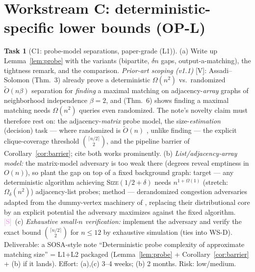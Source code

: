 \documentclass[11pt]{article}
\theoremstyle{definition}
\newtheorem{task}{Task}
\theoremstyle{remark}
\newcommand{\statusV}{\textcolor{green!45!black}{\textsf{[V]}}}
\newcommand{\statusS}{\textcolor{violet}{\textsf{[S]}}}
\newcommand{\Otil}{\widetilde{O}}
\begin{document}
\section{Workstream C: deterministic-specific lower bounds (OP-L)}
\label{sec:wsC}

\begin{task}[C1: probe-model separations, paper-grade (L1)]
\label{task:probe}
(a) Write up Lemma~\ref{lem:probe} with the variants (bipartite,
$\delta n$ gaps, output-a-matching), the tightness remark, and the
\cite{ABKRS04} comparison. \emph{Prior-art scoping (v1.1)}
\statusV{}: Assadi--Solomon \cite{AS19} (Thm.~3) already prove a
deterministic $\Omega(n^2)$ vs.\ randomized $\Otil(n\beta)$
separation for \emph{finding} a maximal matching on
adjacency-\emph{array} graphs of neighborhood independence
$\beta=2$, and \cite{ACK19} (Thm.~6) shows finding a maximal
matching needs $\Omega(n^2)$ queries even randomized. The note's
novelty claim must therefore rest on: the adjacency-\emph{matrix}
probe model, the size-\emph{estimation} (decision) task --- where
randomized is $\Otil(n)$ \cite{Beh21}, unlike finding --- the
explicit clique-coverage threshold
$\binom{\lceil n/2\rceil}{2}$, and the pipeline barrier of
Corollary~\ref{cor:barrier}; cite both works prominently.
(b) \emph{List/adjacency-array model:} the matrix-model adversary is too
weak there (degrees reveal emptiness in $O(n)$), so plant the gap on top
of a fixed background graph: target --- any deterministic algorithm
achieving \textsc{Size}$(1/2+\delta)$ needs $n^{1+\Omega(1)}$
(stretch: $\Omega_{\delta}(n^2)$) adjacency-list probes; method ---
derandomized congestion adversaries adapted from the dummy-vertex
machinery of \cite{BRR24}, replacing their distributional core by an
explicit potential the adversary maximizes against the fixed algorithm.
\statusS\
(c) \emph{Exhaustive small-$n$ verification:} implement the adversary
and verify the exact bound $\binom{\lceil n/2\rceil}{2}$ for
$n\le 12$ by exhaustive simulation (ties into WS-D).
Deliverable: a SOSA-style note ``Deterministic probe complexity of
approximate matching size'' = L1+L2 packaged
(Lemma~\ref{lem:probe} + Corollary~\ref{cor:barrier} + (b) if it
lands). Effort: (a),(c) 3--4 weeks; (b) 2 months. Risk: low/medium.
\end{task}
\end{document}

